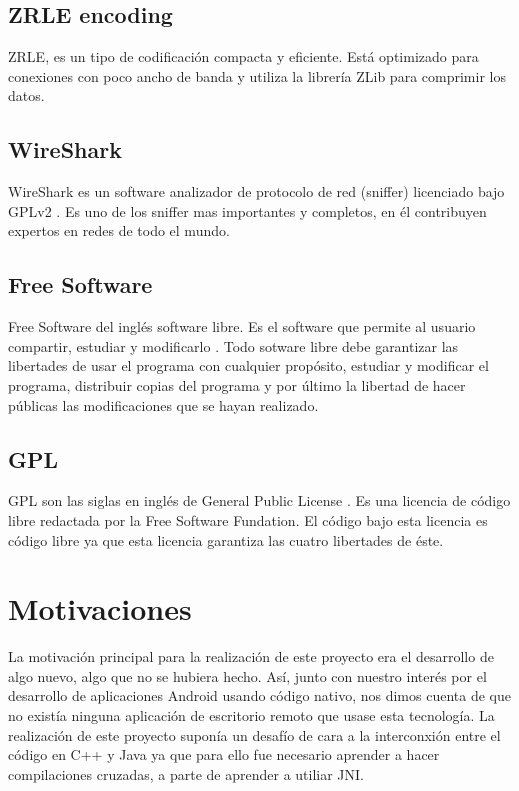 \subsection{ZRLE encoding}

ZRLE, es un tipo de codificación compacta y eficiente. Está optimizado para conexiones con poco ancho de banda y utiliza la librería ZLib para comprimir los datos.

\subsection{WireShark}

WireShark es un software analizador de protocolo de red (sniffer) licenciado bajo GPLv2 \cite{wiresharkpage:wireshark}. Es uno de los sniffer mas importantes y completos, en él contribuyen expertos en redes de todo el mundo.

\subsection{Free Software}

Free Software del inglés software libre. Es el software que permite al usuario compartir, estudiar y modificarlo \cite{FSpage:FS}. Todo sotware libre debe garantizar las libertades de usar el programa con cualquier propósito, estudiar y modificar el programa, distribuir copias del programa y por último la libertad de hacer públicas las modificaciones que se hayan realizado.

\subsection{GPL}

GPL son las siglas en inglés de General Public License \cite{GPLpage:GPL}. Es una licencia de código libre redactada por la Free Software Fundation. El código bajo esta licencia es código libre ya que esta licencia garantiza las cuatro libertades de éste.
\newpage
\section{Motivaciones}

La motivación principal para la realización de este proyecto era el desarrollo de algo nuevo, algo que no se hubiera hecho. Así, junto con nuestro interés por el desarrollo de aplicaciones Android usando código nativo, nos dimos cuenta de que no existía ninguna aplicación de escritorio remoto que usase esta tecnología. La realización de este proyecto suponía un desafío de cara a la interconxión entre el código en C++ y Java ya que para ello fue necesario aprender a hacer compilaciones cruzadas, a parte de aprender a utiliar JNI.

